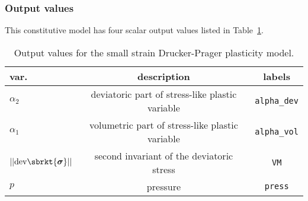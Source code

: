 \subsubsection{Output values}
This constitutive model has four scalar output values listed in
Table~\ref{tab.mat.DP.LinearHardening.output}.
\begin{table}[h]
\caption{\label{tab.mat.DP.LinearHardening.output} Output values 
for the small strain Drucker-Prager plasticity model.}
\begin{center}
\begin{tabular}[c]{|l|c|c|}
\hline
 \parbox[c]{0.75in}{\centering \textbf{var.}}
&\parbox[c]{3.0in}{\raggedright \textbf{description}}
&\parbox[c]{1.0in}{\raggedright  \textbf{labels}}\\
\hline
\parbox[c]{0.75in}{\centering $\alpha_{2}$} & 
\parbox[c]{3.0in}{\raggedright \vspace{2pt}
deviatoric part of stress-like plastic variable
\vspace{2pt}} &
\parbox[c]{1.0in}{\raggedright \texttt{alpha\_dev}}\\
\hline
\parbox[c]{0.75in}{\centering $\alpha_{1}$} & 
\parbox[c]{3.0in}{\raggedright \vspace{2pt}
volumetric part of stress-like plastic variable
\vspace{2pt}} &
\parbox[c]{1.0in}{\raggedright \texttt{alpha\_vol}}\\
\hline
\parbox[c]{0.75in}{\centering $||\textrm{dev}\sbrkt{\boldsymbol{\sigma}}||$}  & 
\parbox[c]{3.0in}{\raggedright second invariant of the deviatoric stress} &
\parbox[c]{1.0in}{\raggedright \texttt{VM}}\\
\hline
\parbox[c]{0.75in}{\centering $p$}  & 
\parbox[c]{3.0in}{\raggedright pressure} &
\parbox[c]{1.0in}{\raggedright \texttt{press}}\\
\hline
\end{tabular}
\end{center}
\end{table}

